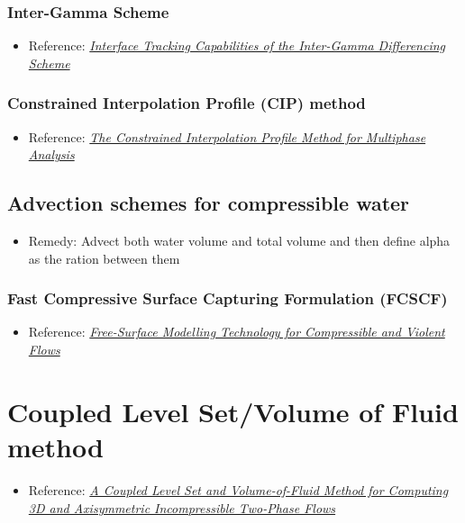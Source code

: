 \subsubsection{Inter-Gamma Scheme}

\begin{itemize}
    \item Reference: \textit{\href{http://powerlab.fsb.hr/ped/kturbo/openfoam/docs/InterTrack.pdf}{Interface Tracking Capabilities of the Inter-Gamma Differencing Scheme}}
\end{itemize}

\subsubsection{Constrained Interpolation Profile (CIP) method}


\begin{itemize}
    \item Reference: \textit{\href{http://www.mech.titech.ac.jp/~ryuutai/paper/JCP2001CIPReviewYabe.pdf}{The Constrained Interpolation Profile Method for Multiphase Analysis}}
\end{itemize}

\subsection{Advection schemes for compressible water}

\begin{itemize}
    \item Remedy: Advect both water volume and total volume and then define alpha as the ration between them
\end{itemize}

\subsubsection{Fast Compressive Surface Capturing Formulation (FCSCF)}

\begin{itemize}
    \item Reference: \textit{\href{http://researchspace.csir.co.za/dspace/bitstream/10204/5282/1/Heyns_2011.pdf}{Free-Surface Modelling Technology for Compressible and Violent Flows}}
\end{itemize}

\section{Coupled Level Set/Volume of Fluid  method}

\begin{itemize}
    \item Reference: \textit{\href{http://pages.csam.montclair.edu/~yecko/icodes/SussmanPuckett_LevelSetVOF.pdf}{A Coupled Level Set and Volume-of-Fluid Method for Computing 3D and Axisymmetric Incompressible Two-Phase Flows}}
\end{itemize}